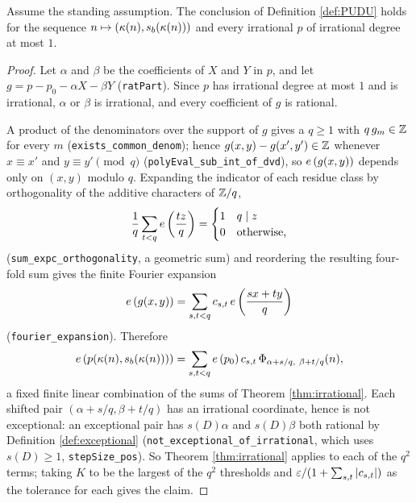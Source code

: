 \begin{theorem}
  \label{thm:UD1}
  \leanok
  Assume the standing assumption. The conclusion of Definition \ref{def:PUDU}
  holds for the sequence $n \mapsto (\kappa(n), s_b(\kappa(n)))$ and every
  irrational $p$ of irrational degree at most $1$.
\end{theorem}
\begin{proof}
  \leanok
  Let $\alpha$ and $\beta$ be the coefficients of $X$ and $Y$ in $p$, and let
  $g = p - p_0 - \alpha X - \beta Y$ (\texttt{ratPart}). Since $p$ has
  irrational degree at most $1$ and is irrational, $\alpha$ or $\beta$ is
  irrational, and every coefficient of $g$ is rational.

  A product of the denominators over the support of $g$ gives a $q \geq 1$
  with $q\,g_m \in \mathbb{Z}$ for every $m$ (\texttt{exists\_common\_denom}); hence
  $g(x,y) - g(x',y') \in \mathbb{Z}$ whenever $x \equiv x'$ and $y \equiv y' \pmod q$
  (\texttt{polyEval\_sub\_int\_of\_dvd}), so $e\left(g(x,y)\right)$ depends only on
  $(x,y)$ modulo $q$. Expanding the indicator of each residue class by
  orthogonality of the additive characters of $\mathbb{Z}/q$,
  \[
    \frac{1}{q}\sum_{t < q} e\left(\frac{tz}{q}\right)
      = \begin{cases} 1 & q \mid z \\ 0 & \text{otherwise,}\end{cases}
  \]
  (\texttt{sum\_expc\_orthogonality}, a geometric sum) and reordering the
  resulting four-fold sum gives the finite Fourier expansion
  \[
    e\left(g(x,y)\right) = \sum_{s,t < q} c_{s,t}\, e\left(\frac{sx + ty}{q}\right)
  \]
  (\texttt{fourier\_expansion}). Therefore
  \[
    e\left(p(\kappa(n), s_b(\kappa(n)))\right)
      = \sum_{s,t<q} e\left(p_0\right) c_{s,t}\,
        \Phi_{\alpha + s/q,\ \beta + t/q}(n) ,
  \]
  a fixed finite linear combination of the sums of Theorem
  \ref{thm:irrational}. Each shifted pair $(\alpha + s/q, \beta + t/q)$ has an
  irrational coordinate, hence is not exceptional: an exceptional pair has
  $s(D)\alpha$ and $s(D)\beta$ both rational by Definition
  \ref{def:exceptional} (\texttt{not\_exceptional\_of\_irrational}, which uses
  $s(D) \geq 1$, \texttt{stepSize\_pos}). So Theorem \ref{thm:irrational}
  applies to each of the $q^2$ terms; taking $K$ to be the largest of the $q^2$
  thresholds and $\varepsilon/(1 + \sum_{s,t}\left\lvert c_{s,t} \right\rvert)$ as the tolerance
  for each gives the claim.
\end{proof}

